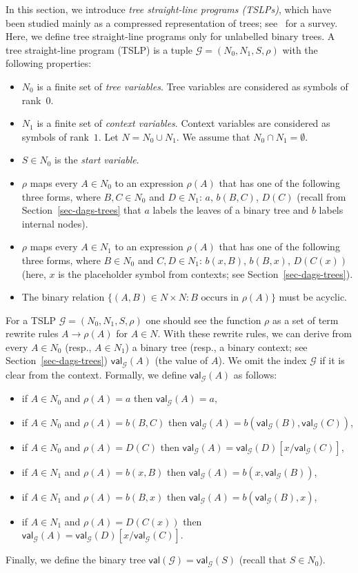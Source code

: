 \documentclass[a4paper,UKenglish,cleveref, autoref, thm-restate, numberwithinsect]{lipics-v2021}
\newcommand{\val}{\mathsf{val}}
\begin{document}
In this section, we introduce \emph{tree straight-line programs (TSLPs)}, which have been studied mainly as a compressed representation of trees; see~\cite{Lohrey15} for a survey. Here, we define tree straight-line programs only for unlabelled binary trees.
A  tree straight-line program (TSLP) is a tuple $\mathcal{G} = (N_0, N_1, S, \rho)$ with the following properties:
\begin{itemize}
\item $N_0$ is a finite set of \emph{tree variables}. Tree variables are considered as symbols of rank~$0$.
\item $N_1$ is a finite set of \emph{context variables}. Context variables are considered as symbols of rank~$1$. Let $N = N_0 \cup N_1$.
We assume that $N_0 \cap N_1 = \emptyset$.
\item $S \in N_0$ is the \emph{start variable}.
\item $\rho$ maps every $A \in N_0$ to an expression $\rho(A)$ that has one of the following three forms, where
$B,C \in N_0$ and $D \in N_1$: $a$, $b(B,C)$, $D(C)$ (recall from Section~\ref{sec-dags-trees} that $a$ labels the leaves of a binary
tree and $b$ labels internal nodes).
\item $\rho$ maps every $A \in N_1$ to an expression $\rho(A)$ that has one of the following three forms, where
$B \in N_0$ and $C,D\in N_1$: $b(x,B)$, $b(B,x)$, $D(C(x))$ (here, $x$ is the placeholder symbol from contexts; see Section~\ref{sec-dags-trees}).
\item The binary relation $\{ (A,B) \in N \times N : B \text{ occurs in } \rho(A) \}$ must be acyclic.
\end{itemize}
For a TSLP $\mathcal{G} = (N_0, N_1, S, \rho)$ one should see the function $\rho$ as a set of term rewrite rules
$A \to \rho(A)$ for $A \in N$.
With these rewrite rules, we can derive from every $ A\in N_0$ (resp., $A \in N_1$) a binary tree
(resp., a binary context; see Section~\ref{sec-dags-trees}) $\val_{\mathcal{G}}(A)$ (the value of $A$). We omit the index $\mathcal{G}$ if it is clear
from the context. Formally, we define $\val_{\mathcal{G}}(A)$ as follows:
\begin{itemize}
\item if $A \in N_0$ and $\rho(A)=a$ then $\val_{\mathcal{G}}(A) = a$,
\item if $A \in N_0$ and $\rho(A)=b(B,C)$ then $\val_{\mathcal{G}}(A) = b(\val_{\mathcal{G}}(B),\val_{\mathcal{G}}(C))$,
\item if $A \in N_0$ and $\rho(A)=D(C)$ then $\val_{\mathcal{G}}(A) = \val_{\mathcal{G}}(D)[x/\val_{\mathcal{G}}(C)]$,
\item if $A \in N_1$ and $\rho(A)=b(x,B)$ then $\val_{\mathcal{G}}(A) = b(x,\val_{\mathcal{G}}(B))$,
\item if $A \in N_1$ and $\rho(A)=b(B,x)$ then $\val_{\mathcal{G}}(A) = b(\val_{\mathcal{G}}(B),x)$,
\item if $A \in N_1$ and $\rho(A)=D(C(x))$ then $\val_{\mathcal{G}}(A) = \val_{\mathcal{G}}(D)[x/\val_{\mathcal{G}}(C)]$.  
\end{itemize}
Finally, we define the binary tree $\val(\mathcal{G}) = \val_{\mathcal{G}}(S)$ (recall that $S \in N_0$).
\end{document}

